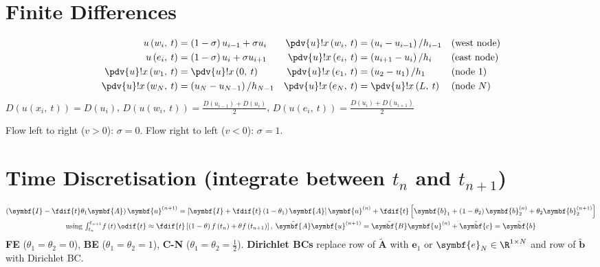 \documentclass{article}
\begin{document}
\begin{minipage}[t]{126.1962963mm}
    \section{Finite Differences}
    \begin{align*}
        u\left( w_i,\: t \right)           & = \left( 1 - \sigma \right) u_{i-1} + \sigma u_i & \pdv{u}!{x}\left( w_i,\: t \right) & = \left( u_i - u_{i-1} \right) / h_{i-1} &  & \text{(west node)}  \\
        u\left( e_i,\: t \right)           & = \left( 1 - \sigma \right) u_i + \sigma u_{i+1} & \pdv{u}!{x}\left( e_i,\: t \right) & = \left( u_{i+1} - u_i \right) / h_i     &  & \text{(east node)}  \\
        \pdv{u}!{x}\left( w_1,\: t \right) & = \pdv{u}!{x}\left( 0,\: t \right)               & \pdv{u}!{x}\left( e_1,\: t \right) & = \left( u_2 - u_1 \right) / h_1         &  & \text{(node 1)}     \\
        \pdv{u}!{x}\left( w_N,\: t \right) & = \left( u_N - u_{N-1} \right) / h_{N-1}         & \pdv{u}!{x}\left( e_N,\: t \right) & = \pdv{u}!{x}\left( L,\: t \right)       &  & \text{(node \(N\))}
    \end{align*}
    \(D\left( u\left( x_i,\: t \right) \right) = D\left( u_i \right)\),
    \(D\left( u\left( w_i,\: t \right) \right) = \frac{D\left( u_{i-1} \right) + D\left( u_i \right)}{2}\),
    \(D\left( u\left( e_i,\: t \right) \right) = \frac{D\left( u_i \right) + D\left( u_{i+1} \right)}{2}\)

    Flow left to right (\(v > 0\)): \(\sigma = 0\). Flow right to left
    (\(v < 0\)): \(\sigma = 1\).
    \section{Time Discretisation (integrate between \texorpdfstring{\(t_n\)}{tn} and \texorpdfstring{\(t_{n+1}\)}{tn+1})}
    \begin{gather*}
        \left( \symbf{I} - \fdif{t} \theta_1 \symbf{A} \right) \symbf{u}^{\left( n+1 \right)} = \left[ \symbf{I} + \fdif{t} \left( 1 - \theta_1 \right) \symbf{A} \right] \symbf{u}^{\left( n \right)} + \fdif{t} \left[ \symbf{b}_1 + \left( 1 - \theta_2 \right) \symbf{b}_2^{\left( n \right)} + \theta_2 \symbf{b}_2^{\left( n+1 \right)} \right] \\
        \text{using } {\textstyle\int_{t_n}^{t_{n+1}}} f\left( t \right) \odif{t} \approx \fdif{t} \left[ \left( 1 - \theta \right) f\left( t_n \right) + \theta f\left( t_{n+1} \right) \right],\: \tilde{\symbf{A}} \symbf{u}^{\left( n+1 \right)} = \tilde{\symbf{B}} \symbf{u}^{\left( n \right)} + \tilde{\symbf{c}} = \tilde{\symbf{b}}
    \end{gather*}
    \textbf{FE} (\(\theta_1 = \theta_2 = 0\)), \textbf{BE} (\(\theta_1 = \theta_2 = 1\)), \textbf{C-N} (\(\theta_1 = \theta_2 = \frac{1}{2}\)).
    \textbf{Dirichlet BCs} replace row of \(\tilde{\symbf{A}}\) with
    \(\symbf{e}_1\) or \(\symbf{e}_N \in \R^{1 \times N}\) and row of
    \(\tilde{\symbf{b}}\) with Dirichlet BC.

\end{minipage}
\end{document}
